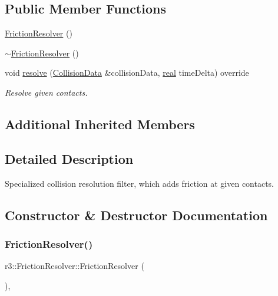 \subsection*{Public Member Functions}
\begin{DoxyCompactItemize}
\item 
\mbox{\hyperlink{classr3_1_1_friction_resolver_a55a3a08603cf362da1896ec2ccc026ba}{Friction\+Resolver}} ()
\item 
\mbox{\hyperlink{classr3_1_1_friction_resolver_a49a41d6820e9c9c17447c79303296dea}{$\sim$\+Friction\+Resolver}} ()
\item 
void \mbox{\hyperlink{classr3_1_1_friction_resolver_af26a84959e95749088f713176ec3c096}{resolve}} (\mbox{\hyperlink{classr3_1_1_collision_data}{Collision\+Data}} \&collision\+Data, \mbox{\hyperlink{namespacer3_ab2016b3e3f743fb735afce242f0dc1eb}{real}} time\+Delta) override
\begin{DoxyCompactList}\small\item\em Resolve given contacts. \end{DoxyCompactList}\end{DoxyCompactItemize}
\subsection*{Additional Inherited Members}


\subsection{Detailed Description}
Specialized collision resolution filter, which adds friction at given contacts. 

\subsection{Constructor \& Destructor Documentation}
\mbox{\label{classr3_1_1_friction_resolver_a55a3a08603cf362da1896ec2ccc026ba}} 
\subsubsection{\texorpdfstring{Friction\+Resolver()}{FrictionResolver()}}
{\footnotesize\ttfamily r3\+::\+Friction\+Resolver\+::\+Friction\+Resolver (\begin{DoxyParamCaption}{ }\end{DoxyParamCaption})\hspace{0.3cm}{\ttfamily [explicit]}, {\ttfamily [default]}}

